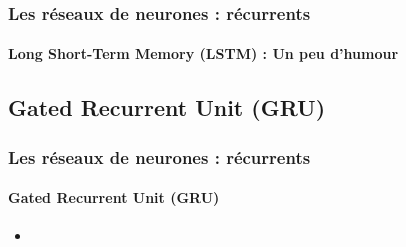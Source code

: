 \documentclass[xcolor=table]{beamer}
\begin{document}
\begin{frame}
\frametitle{Les réseaux de neurones : récurrents}
\framesubtitle{Long Short-Term Memory (LSTM) : Un peu d'humour}

\begin{center}
\end{center}

\end{frame}

\subsection{Gated Recurrent Unit (GRU)}

\begin{frame}
\frametitle{Les réseaux de neurones : récurrents}
\framesubtitle{Gated Recurrent Unit (GRU)}

\begin{itemize}
	\item 
\end{itemize}

\end{frame}


\end{document}
